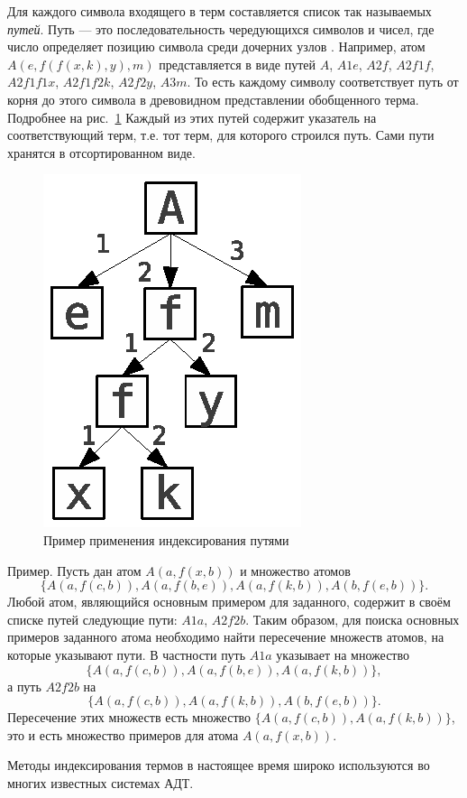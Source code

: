 Для каждого символа входящего в терм составляется список так называемых \emph{путей}. Путь --- это последовательность чередующихся символов и чисел, где число определяет позицию символа среди дочерних узлов \cite{disctree}. Например, атом $A(e,f(f(x,k),y),m)$ представляется в виде путей $A$, $A1e$, $A2f$, $A2f1f$, $A2f1f1x$, $A2f1f2k$, $A2f2y$, $A3m$. То есть каждому символу соответствует путь от корня до этого символа в древовидном представлении обобщенного терма. Подробнее на рис.~\ref{pathfig} Каждый из этих путей содержит указатель на соответствующий терм, т.е. тот терм, для которого строился путь. Сами пути хранятся в отсортированном виде.
\begin{figure}[h]
	\centering
	\includegraphics[width=0.2\linewidth]{pics/Path1.eps}
	\caption{Пример применения индексирования путями}
	\label{pathfig}
\end{figure}

Пример. Пусть дан атом $A(a,f(x,b))$ и множество атомов
$$\{A(a,f(c,b)), A(a,f(b,e)),A(a,f(k,b)), A(b,f(e,b))\}.$$
Любой атом, являющийся основным примером для заданного, содержит в своём списке путей следующие пути: $A1a$, $A2f2b$. Таким образом, для поиска основных примеров заданного атома необходимо найти пересечение множеств атомов, на которые указывают пути.  В частности путь $A1a$ указывает на множество
$$\{A(a,f(c,b)), A(a,f(b,e)),A(a,f(k,b))\},$$
а путь $A2f2b$ на
$$\{A(a,f(c,b)), A(a,f(k,b)), A(b,f(e,b))\}.$$
Пересечение этих множеств есть множество $\{A(a,f(c,b)),A(a,f(k,b))\}$, это и есть множество примеров для атома $A(a,f(x,b))$.

Методы индексирования термов в настоящее время широко используются во многих известных системах АДТ. %

